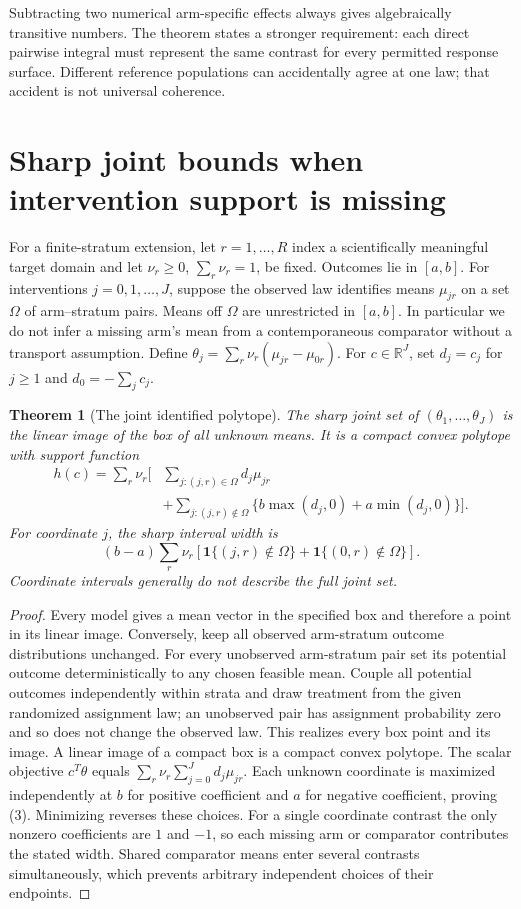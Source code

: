 \documentclass[11pt]{article}
\newtheorem{theorem}{Theorem}
\theoremstyle{remark}\newtheorem{remark}[theorem]{Remark}
\newcommand{\R}{\mathbb R}
\newcommand{\Ind}{\mathbf 1}
\begin{document}
Subtracting two numerical arm-specific effects always gives algebraically transitive numbers. The theorem states a stronger requirement: each direct pairwise integral must represent the same contrast for every permitted response surface. Different reference populations can accidentally agree at one law; that accident is not universal coherence.

\section{Sharp joint bounds when intervention support is missing}
For a finite-stratum extension, let $r=1,\ldots,R$ index a scientifically meaningful target domain and let $\nu_r\geq0$, $\sum_r\nu_r=1$, be fixed. Outcomes lie in $[a,b]$. For interventions $j=0,1,\ldots,J$, suppose the observed law identifies means $\mu_{jr}$ on a set $\Omega$ of arm--stratum pairs. Means off $\Omega$ are unrestricted in $[a,b]$. In particular we do not infer a missing arm's mean from a contemporaneous comparator without a transport assumption.
Define
$\theta_j=\sum_r\nu_r(\mu_{jr}-\mu_{0r})$.
For $c\in\R^J$, set $d_j=c_j$ for $j\geq1$ and $d_0=-\sum_jc_j$.

\begin{theorem}[The joint identified polytope]\label{polytope}
The sharp joint set of $(\theta_1,\ldots,\theta_J)$ is the linear image of the box of all unknown means. It is a compact convex polytope with support function
\[
 \begin{split}
 h(c)=\sum_r\nu_r\bigg[&\sum_{j:(j,r)\in\Omega}d_j\mu_{jr}\\
  &+\sum_{j:(j,r)\notin\Omega}
       \{b\max(d_j,0)+a\min(d_j,0)\}\bigg].
 \end{split}\tag{3}
\]
For coordinate $j$, the sharp interval width is
\[
 (b-a)\sum_r\nu_r
       [\Ind\{(j,r)\notin\Omega\}+\Ind\{(0,r)\notin\Omega\}].
\]
Coordinate intervals generally do not describe the full joint set.
\end{theorem}
\begin{proof}
Every model gives a mean vector in the specified box and therefore a point in its linear image. Conversely, keep all observed arm-stratum outcome distributions unchanged. For every unobserved arm-stratum pair set its potential outcome deterministically to any chosen feasible mean. Couple all potential outcomes independently within strata and draw treatment from the given randomized assignment law; an unobserved pair has assignment probability zero and so does not change the observed law. This realizes every box point and its image. A linear image of a compact box is a compact convex polytope.
The scalar objective $c^T\theta$ equals $\sum_r\nu_r\sum_{j=0}^Jd_j\mu_{jr}$. Each unknown coordinate is maximized independently at $b$ for positive coefficient and $a$ for negative coefficient, proving (3). Minimizing reverses these choices. For a single coordinate contrast the only nonzero coefficients are $1$ and $-1$, so each missing arm or comparator contributes the stated width. Shared comparator means enter several contrasts simultaneously, which prevents arbitrary independent choices of their endpoints.
\end{proof}
\end{document}
